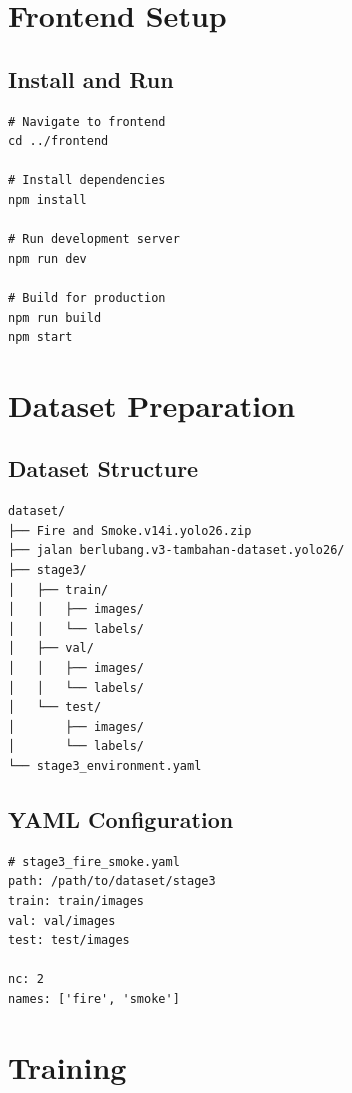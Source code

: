 \documentclass[12pt,a4paper,oneside]{book}
\begin{document}
\section{Frontend Setup}

\subsection{Install and Run}

\begin{verbatim}
# Navigate to frontend
cd ../frontend

# Install dependencies
npm install

# Run development server
npm run dev

# Build for production
npm run build
npm start
\end{verbatim}

\section{Dataset Preparation}

\subsection{Dataset Structure}

\begin{verbatim}
dataset/
├── Fire and Smoke.v14i.yolo26.zip
├── jalan berlubang.v3-tambahan-dataset.yolo26/
├── stage3/
│   ├── train/
│   │   ├── images/
│   │   └── labels/
│   ├── val/
│   │   ├── images/
│   │   └── labels/
│   └── test/
│       ├── images/
│       └── labels/
└── stage3_environment.yaml
\end{verbatim}

\subsection{YAML Configuration}

\begin{lstlisting}[style=pythonstyle]
# stage3_fire_smoke.yaml
path: /path/to/dataset/stage3
train: train/images
val: val/images
test: test/images

nc: 2
names: ['fire', 'smoke']
\end{lstlisting}

\section{Training}
\end{document}
